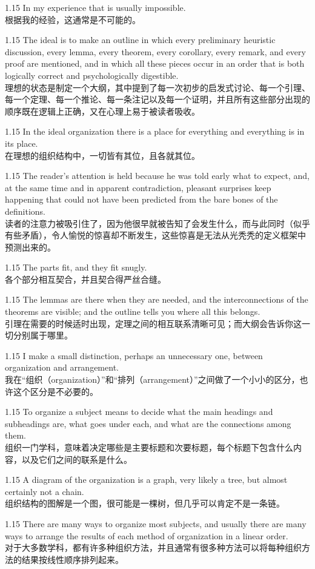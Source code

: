 \documentclass[12pt,a4paper]{article}
\newcommand{\bilingual}[2]{
    \begin{spacing}{1.15} %
        \noindent \normalsize #1 \\[-0.5ex] %
        \small \textcolor{blue!70!black}{#2} %
    \end{spacing}
    \vspace{0.8em} %
}
\begin{document}
\bilingual{In my experience that is usually impossible.}
{根据我的经验，这通常是不可能的。} %

\bilingual{The ideal is to make an outline in which every preliminary heuristic discussion, every lemma, every theorem, every corollary, every remark, and every proof are mentioned, and in which all these pieces occur in an order that is both logically correct and psychologically digestible.}
{理想的状态是制定一个大纲，其中提到了每一次初步的启发式讨论、每一个引理、每一个定理、每一个推论、每一条注记以及每一个证明，并且所有这些部分出现的顺序既在逻辑上正确，又在心理上易于被读者吸收。} %

\bilingual{In the ideal organization there is a place for everything and everything is in its place.}
{在理想的组织结构中，一切皆有其位，且各就其位。} %

\bilingual{The reader's attention is held because he was told early what to expect, and, at the same time and in apparent contradiction, pleasant surprises keep happening that could not have been predicted from the bare bones of the definitions.}
{读者的注意力被吸引住了，因为他很早就被告知了会发生什么，而与此同时（似乎有些矛盾），令人愉悦的惊喜却不断发生，这些惊喜是无法从光秃秃的定义框架中预测出来的。} %

\bilingual{The parts fit, and they fit snugly.}
{各个部分相互契合，并且契合得严丝合缝。} %

\bilingual{The lemmas are there when they are needed, and the interconnections of the theorems are visible; and the outline tells you where all this belongs.}
{引理在需要的时候适时出现，定理之间的相互联系清晰可见；而大纲会告诉你这一切分别属于哪里。} %

\bilingual{I make a small distinction, perhaps an unnecessary one, between organization and arrangement.}
{我在“组织（organization）”和“排列（arrangement）”之间做了一个小小的区分，也许这个区分是不必要的。} %

\bilingual{To organize a subject means to decide what the main headings and subheadings are, what goes under each, and what are the connections among them.}
{组织一门学科，意味着决定哪些是主要标题和次要标题，每个标题下包含什么内容，以及它们之间的联系是什么。} %

\bilingual{A diagram of the organization is a graph, very likely a tree, but almost certainly not a chain.}
{组织结构的图解是一个图，很可能是一棵树，但几乎可以肯定不是一条链。} %

\bilingual{There are many ways to organize most subjects, and usually there are many ways to arrange the results of each method of organization in a linear order.}
{对于大多数学科，都有许多种组织方法，并且通常有很多种方法可以将每种组织方法的结果按线性顺序排列起来。} %
\end{document}
